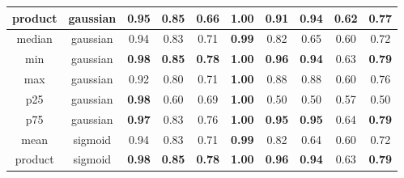\begin{table*}[!b]
\begin{tabular}{|c|c|c|c|c|c|c|c|c|c|}
        \hline
                product &        gaussian &                     0.95 &                 \textbf{0.85} &                    0.66 &          \textbf{1.00} &                        0.91 &               \textbf{0.94} &                   0.62 &               \textbf{0.77} \\
        \hline
                 median &        gaussian &                     0.94 &                          0.83 &                    0.71 &          \textbf{0.99} &                        0.82 &                        0.65 &                   0.60 &                        0.72 \\
        \hline
                    min &        gaussian &            \textbf{0.98} &                 \textbf{0.85} &           \textbf{0.78} &          \textbf{1.00} &               \textbf{0.96} &               \textbf{0.94} &                   0.63 &               \textbf{0.79} \\
        \hline
                    max &        gaussian &                     0.92 &                          0.80 &                    0.71 &          \textbf{1.00} &                        0.88 &                        0.88 &                   0.60 &                        0.76 \\
        \hline
                    p25 &        gaussian &            \textbf{0.98} &                          0.60 &                    0.69 &          \textbf{1.00} &                        0.50 &                        0.50 &                   0.57 &                        0.50 \\
        \hline
                    p75 &        gaussian &            \textbf{0.97} &                          0.83 &                    0.76 &          \textbf{1.00} &               \textbf{0.95} &               \textbf{0.95} &                   0.64 &               \textbf{0.79} \\
        \hline
                   mean &         sigmoid &                     0.94 &                          0.83 &                    0.71 &          \textbf{0.99} &                        0.82 &                        0.64 &                   0.60 &                        0.72 \\
        \hline
                product &         sigmoid &            \textbf{0.98} &                 \textbf{0.85} &           \textbf{0.78} &          \textbf{1.00} &               \textbf{0.96} &               \textbf{0.94} &                   0.63 &               \textbf{0.79} \\

\end{tabular}
\end{table*}
